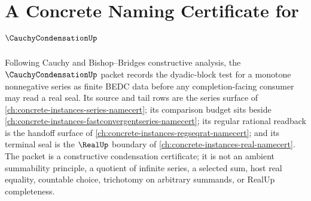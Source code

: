 \chapter{A Concrete Naming Certificate for $\CauchyCondensationUp$}
\label{ch:concrete-instances-cauchycondensation-namecert}

Following Cauchy and Bishop--Bridges constructive analysis, the $\CauchyCondensationUp$ packet records the dyadic-block test for a monotone nonnegative series as finite BEDC data before any completion-facing consumer may read a real seal. Its source and tail rows are the series surface of \autoref{ch:concrete-instances-series-namecert}; its comparison budget sits beside \autoref{ch:concrete-instances-fastconvergentseries-namecert}; its regular rational readback is the handoff surface of \autoref{ch:concrete-instances-regseqrat-namecert}; and its terminal seal is the $\RealUp$ boundary of \autoref{ch:concrete-instances-real-namecert}. The packet is a constructive condensation certificate; it is not an ambient summability principle, a quotient of infinite series, a selected sum, host real equality, countable choice, trichotomy on arbitrary summands, or RealUp completeness.

